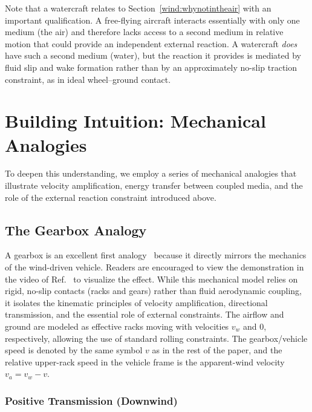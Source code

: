 \documentclass[a4paper]{article}
\begin{document}
Note that a watercraft relates to Section~\ref{wind:whynotintheair} with an important
qualification. A free-flying aircraft interacts essentially with only one medium
(the air) and therefore lacks access to a second medium in relative motion that
could provide an independent external reaction. A watercraft \emph{does} have such
a second medium (water), but the reaction it provides is mediated by fluid slip and
wake formation rather than by an approximately no-slip traction constraint, as in
ideal wheel--ground contact.

\section{Building Intuition: Mechanical Analogies}

To deepen this understanding, we employ a series of mechanical analogies that
illustrate velocity amplification, energy transfer between coupled media, and
the role of the external reaction constraint introduced above.

\subsection{The Gearbox Analogy}

A gearbox is an excellent first analogy~\cite{veritasium_2021_physics} because it directly mirrors the mechanics of the wind-driven vehicle.
Readers are encouraged to view the demonstration in the video of Ref.~\cite{veritasium_2021_physics} to visualize the effect.
While this mechanical model relies on rigid, no-slip contacts (racks and gears) rather than fluid aerodynamic coupling, it isolates the kinematic principles of velocity amplification, directional transmission, and the essential role of external constraints.
The airflow and ground are modeled as effective racks moving with velocities
\(v_w\) and \(0\), respectively, allowing the use of standard rolling
constraints. The gearbox/vehicle speed is denoted by the same symbol \(v\) as
in the rest of the paper, and the relative upper-rack speed in the vehicle
frame is the apparent-wind velocity \(v_a=v_w-v\).

\subsubsection{Positive Transmission (Downwind)}
\end{document}
